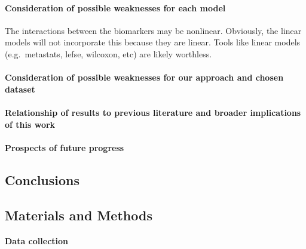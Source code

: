 \documentclass[11pt,]{article}
\let\oldparagraph\paragraph
\renewcommand{\paragraph}[1]{\oldparagraph{#1}\mbox{}}
\begin{document}
\paragraph{Consideration of possible weaknesses for each
model}\label{consideration-of-possible-weaknesses-for-each-model}

The interactions between the biomarkers may be nonlinear. Obviously, the
linear models will not incorporate this because they are linear. Tools
like linear models (e.g.~metastats, lefse, wilcoxon, etc) are likely
worthless.

\paragraph{Consideration of possible weaknesses for our approach and
chosen
dataset}\label{consideration-of-possible-weaknesses-for-our-approach-and-chosen-dataset}

\paragraph{Relationship of results to previous literature and broader
implications of this
work}\label{relationship-of-results-to-previous-literature-and-broader-implications-of-this-work}

\paragraph{Prospects of future
progress}\label{prospects-of-future-progress}

\subsection{Conclusions}\label{conclusions}

\subsection{Materials and Methods}\label{materials-and-methods}

\paragraph{Data collection}\label{data-collection}
\end{document}
